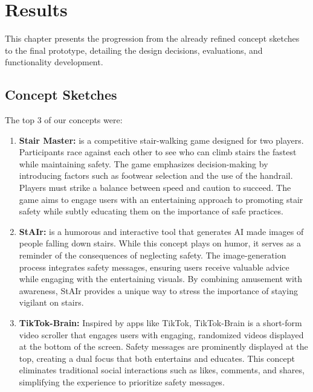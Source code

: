 \documentclass{article}
\begin{document}
\section{Results}
This chapter presents the progression from the already refined concept sketches to the final prototype,
detailing the design decisions, evaluations, and functionality development.

\subsection{Concept Sketches}
The top 3 of our concepts were:

\begin{enumerate}
    \item \textbf{Stair Master:}
        is a competitive stair-walking game designed for two players.
        Participants race against each other to see who can climb stairs the fastest while maintaining safety.
        The game emphasizes decision-making by introducing factors such as footwear selection and the use of the handrail.
        Players must strike a balance between speed and caution to succeed.
        The game aims to engage users with an entertaining approach to promoting stair safety
        while subtly educating them on the importance of safe practices.
    \item \textbf{StAIr:}
        is a humorous and interactive tool that generates AI made images of people falling down stairs.
        While this concept plays on humor, it serves as a reminder of the consequences of neglecting safety.
        The image-generation process integrates safety messages,
        ensuring users receive valuable advice while engaging with the entertaining visuals.
        By combining amusement with awareness, StAIr provides a unique way to stress the importance of staying vigilant on stairs.
    \item \textbf{TikTok-Brain:}
        Inspired by apps like TikTok,
        TikTok-Brain is a short-form video scroller that engages users with engaging,
        randomized videos displayed at the bottom of the screen.
        Safety messages are prominently displayed at the top, creating a dual focus that both entertains and educates.
        This concept eliminates traditional social interactions such as likes, comments, and shares,
        simplifying the experience to prioritize safety messages.
\end{enumerate}

\pagebreak
\end{document}
